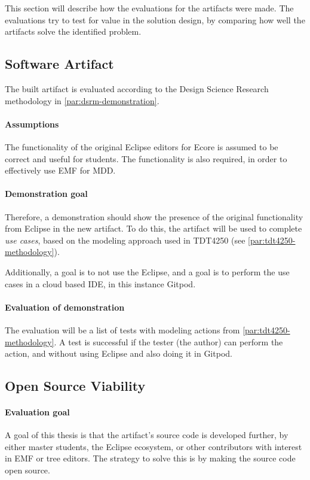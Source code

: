 
This section will describe how the evaluations for the artifacts were made.
The evaluations try to test for value in the solution design, by comparing how well the artifacts solve the identified problem.

\subsection{Software Artifact}

The built artifact is evaluated according to the Design Science Research methodology in \cref{par:dsrm-demonstration}.

\paragraph{Assumptions}
The functionality of the original \gls{Eclipse} editors for \gls{Ecore} is assumed to be correct and useful for students.
The functionality is also required, in order to effectively use \acrshort{EMF} for \acrfull{MDD}.

\paragraph{Demonstration goal}
Therefore, a demonstration should show the presence of the original functionality from \gls{Eclipse} in the new artifact.
To do this, the artifact will be used to complete \textit{use cases}, based on the modeling approach used in \gls{TDT4250} (see \cref{par:tdt4250-methodology}).


Additionally, a goal is to not use the \gls{Eclipse}, and a goal is to perform the use cases in a \gls{cloud} based \gls{IDE}, in this instance \gls{Gitpod}.


\paragraph{Evaluation of demonstration}
The evaluation will be a list of tests with modeling actions from \cref{par:tdt4250-methodology}.
A test is successful if the tester (the author) can perform the action, and without using \gls{Eclipse} and also doing it in \gls{Gitpod}.


\subsection{Open Source Viability}

\paragraph{Evaluation goal}
A goal of this thesis is that the artifact's source code is developed further, by either master students, the Eclipse ecosystem, or other contributors with interest in \acrshort{EMF} or tree editors.
The strategy to solve this is by making the source code \gls{open source}.


